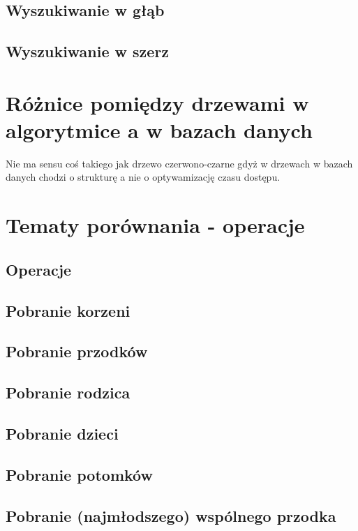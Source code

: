 \subsection{Wyszukiwanie w głąb}
\subsection{Wyszukiwanie w szerz}


\section{Różnice pomiędzy drzewami w algorytmice a w bazach danych}

Nie ma sensu coś takiego jak drzewo czerwono-czarne gdyż w drzewach w bazach danych chodzi o strukturę a nie o optywamizację czasu dostępu.

\section{Tematy porównania - operacje}



\subsection{Operacje}
\subsection{Pobranie korzeni}
\subsection{Pobranie przodków}
\subsection{Pobranie rodzica}
\subsection{Pobranie dzieci}
\subsection{Pobranie potomków}
\subsection{Pobranie (najmłodszego) wspólnego przodka}




